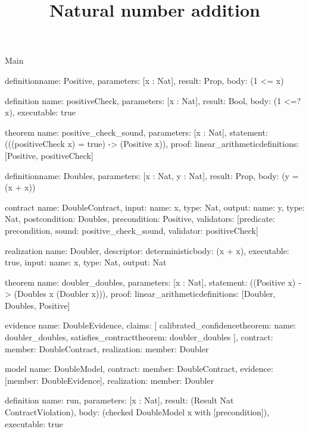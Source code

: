 \begin{lexlean}{Main}
\title{Natural number addition}
\begin{semanticmodule}
definition{name: Positive, parameters: [x : Nat], result: Prop, body: (1 <= x)}

definition{
  name: positiveCheck,
  parameters: [x : Nat],
  result: Bool,
  body: (1 <=? x),
  executable: true
}

theorem{
  name: positive_check_sound,
  parameters: [x : Nat],
  statement: (((positiveCheck x) = true) -> (Positive x)),
  proof: linear_arithmetic{definitions: [Positive, positiveCheck]}
}

definition{name: Doubles, parameters: [x : Nat, y : Nat], result: Prop, body: (y = (x + x))}

contract{
  name: DoubleContract,
  input: {name: x, type: Nat},
  output: {name: y, type: Nat},
  postcondition: Doubles,
  precondition: Positive,
  validators: [{predicate: precondition, sound: positive_check_sound, validator: positiveCheck}]
}

realization{
  name: Doubler,
  descriptor: deterministic{body: (x + x)},
  executable: true,
  input: {name: x, type: Nat},
  output: Nat
}

theorem{
  name: doubler_doubles,
  parameters: [x : Nat],
  statement: ((Positive x) -> (Doubles x (Doubler x))),
  proof: linear_arithmetic{definitions: [Doubler, Doubles, Positive]}
}

evidence{
  name: DoubleEvidence,
  claims: [
    calibrated_confidence{theorem: {name: doubler_doubles}},
    satisfies_contract{theorem: doubler_doubles}
  ],
  contract: {member: DoubleContract},
  realization: {member: Doubler}
}

model{
  name: DoubleModel,
  contract: {member: DoubleContract},
  evidence: [{member: DoubleEvidence}],
  realization: {member: Doubler}
}

definition{
  name: run,
  parameters: [x : Nat],
  result: (Result Nat ContractViolation),
  body: (checked DoubleModel x with [precondition]),
  executable: true
}
\end{semanticmodule}
\end{lexlean}
